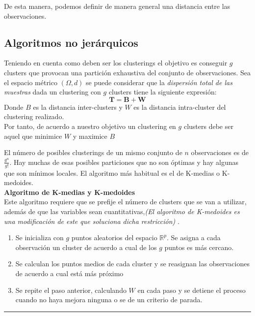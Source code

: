\noindent De esta manera, podemos definir de manera general una distancia entre las observaciones. 

\subsection{Algoritmos no jerárquicos}

\noindent Teniendo en cuenta como deben ser los clusterings el objetivo es conseguir $g$ clusters que provocan una partición exhaustiva del conjunto de observaciones. 
Sea el espacio métrico $(\Omega,d)$ se puede considerar que la \textit{dispersión total de las muestras} dada un clustering con $g$ clusters tiene la siguiente expresión:
\begin{equation}
\textbf{T}=\textbf{B}+\textbf{W}
\end{equation}
\noindent Donde $B$ es la distancia inter-clusters y $W$ es la distancia intra-cluster del clustering realizado.\\
\noindent Por tanto, de acuerdo a nuestro objetivo un clustering en $g$ clusters debe ser aquel que minimice $W$ y maximice $B$

\noindent El número de posibles clusterings de un mismo conjunto de $n$ observaciones es de $\frac{g^n}{g!}$. Hay muchas de esas posibles particiones que no son óptimas y hay algunas que son mínimos locales. El algoritmo más habitual es el de K-medias o K-medoides.\\

\noindent \textbf{Algoritmo de K-medias y K-medoides}\\
Este algoritmo requiere que se prefije el número de clusters que se van a utilizar, además de que las variables sean cuantitativas,\textit{(El algoritmo de K-medoides es una modificación de este que soluciona dicha restricción)} .\\
\begin{enumerate}
\hrule

\item Se inicializa con $g$ puntos aleatorios del espacio $\mathbb{R}^p$. Se asigna a cada observación un cluster de acuerdo a cual de los $g$ puntos es más cercano.
\item Se calculan los puntos medios de cada cluster y se reasignan las observaciones de acuerdo a cual está más próximo 
\item Se repite el paso anterior, calculando $W$ en cada paso y se detiene el proceso cuando no haya mejora ninguna o se de un criterio de parada. 

\end{enumerate}
\hrule

